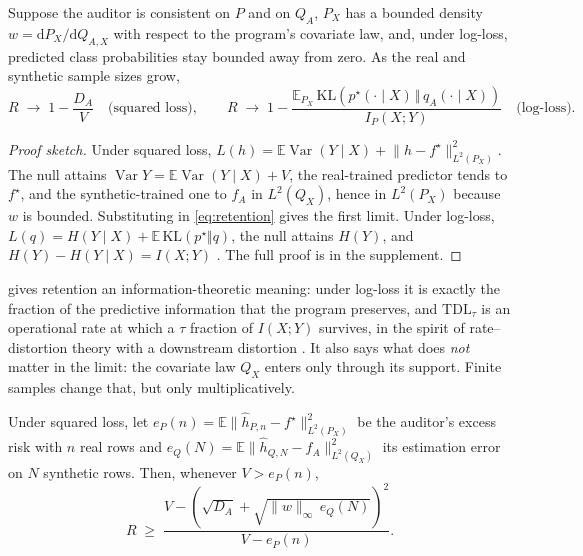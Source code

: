 \begin{theorem}
\label{thm:limit}
Suppose the auditor is consistent on $P$ and on $Q_A$, $P_X$ has a bounded density
$w=\mathrm{d}P_X/\mathrm{d}Q_{A,X}$ with respect to the program's covariate law, and, under
log-loss, predicted class probabilities stay bounded away from zero. As the real and synthetic
sample sizes grow,
\begin{equation}
  R \;\to\; 1-\frac{D_A}{V} \quad\text{(squared loss)},\qquad
  R \;\to\; 1-\frac{\mathbb{E}_{P_X}\,\mathrm{KL}\!\left(p^\star(\cdot\mid X)\,\Vert\,q_A(\cdot\mid X)\right)}{I_P(X;Y)}
  \quad\text{(log-loss)}.
  \label{eq:limit}
\end{equation}
\end{theorem}

\begin{proof}[Proof sketch]
Under squared loss, $L(h)=\mathbb{E}\operatorname{Var}(Y\mid X)+\lVert h-f^\star\rVert^2_{L^2(P_X)}$. The null
attains $\operatorname{Var}Y=\mathbb{E}\operatorname{Var}(Y\mid X)+V$, the real-trained predictor tends to
$f^\star$, and the synthetic-trained one to $f_A$ in $L^2(Q_X)$, hence in $L^2(P_X)$ because $w$ is
bounded. Substituting in \eqref{eq:retention} gives the first limit. Under log-loss,
$L(q)=H(Y\mid X)+\mathbb{E}\,\mathrm{KL}(p^\star\Vert q)$, the null attains $H(Y)$, and
$H(Y)-H(Y\mid X)=I(X;Y)$ \citep{cover2006elements}. The full proof is in the supplement.
\end{proof}

 gives retention an information-theoretic meaning: under log-loss it is exactly the
fraction of the predictive information that the program preserves, and $\mathrm{TDL}_\tau$ is an
operational rate at which a $\tau$ fraction of $I(X;Y)$ survives, in the spirit of rate--distortion
theory with a downstream distortion \citep{shannon1959coding}. It also says what does \emph{not}
matter in the limit: the covariate law $Q_X$ enters only through its support. Finite samples change
that, but only multiplicatively.

\begin{proposition}
\label{prop:finite}
Under squared loss, let $e_P(n)=\mathbb{E}\lVert \hat h_{P,n}-f^\star\rVert^2_{L^2(P_X)}$ be the auditor's
excess risk with $n$ real rows and $e_Q(N)=\mathbb{E}\lVert \hat h_{Q,N}-f_A\rVert^2_{L^2(Q_X)}$ its
estimation error on $N$ synthetic rows. Then, whenever $V>e_P(n)$,
\begin{equation}
  R \;\ge\; \frac{V-\left(\sqrt{D_A}+\sqrt{\lVert w\rVert_\infty\, e_Q(N)}\right)^{2}}{V-e_P(n)} .
  \label{eq:finite}
\end{equation}
\end{proposition}

